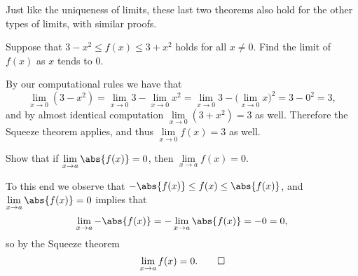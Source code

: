 \begin{remark}
	Just like the uniqueness of limits, these last two theorems also hold for the other types of limits, with similar proofs.
\end{remark}

\begin{example}
	Suppose that $3 - x^2 \leq f(x) \leq 3 + x^2$ holds for all $x \neq 0$. Find the limit of $f(x)$ as $x$ tends to $0$.

	By our computational rules we have that
	\[
		\lim_{x \to 0} (3 - x^2) = \lim_{x \to 0} 3 - \lim_{x \to 0} x^2 = \lim_{x \to 0} 3 - \big ( \lim_{x \to 0} x \big )^2 = 3 - 0^2 = 3,
	\]
	and by almost identical computation $\lim\limits_{x \to 0} (3 + x^2) = 3$ as well. Therefore the Squeeze theorem applies, and thus $\lim\limits_{x \to 0} f(x) = 3$ as well.
\end{example}

\begin{example}
	Show that if $\lim\limits_{x \to a} \abs{f(x)} = 0$, then $\lim\limits_{x \to a} f(x) = 0$.

	To this end we observe that $-\abs{f(x)} \leq f(x) \leq \abs{f(x)}$, and $\lim\limits_{x \to a} \abs{f(x)} = 0$ implies that
	\[
		\lim_{x \to a} - \abs{f(x)} = - \lim_{x \to a} \abs{f(x)} = - 0 = 0,
	\]
	so by the Squeeze theorem
	\[
		\lim_{x \to a} f(x) = 0. \qedhere
	\]
\end{example}
